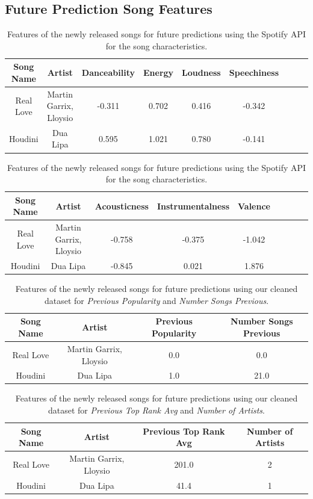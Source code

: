 \documentclass{article}
\begin{document}
\begin{appendices}
\section{Future Prediction Song Features}
\begin{table}[H]
\small
\centering
\caption{Features of the newly released songs for future predictions using the Spotify API for the song characteristics.}\label{table: 4}
\begin{tabular}{|c|c|c|c|c|c|c|c|c|}
\hline
 Song Name & Artist & Danceability & Energy & Loudness & Speechiness \\ 
\hline
 Real Love & Martin Garrix, Lloysio & -0.311 & 0.702 & 0.416 & -0.342 \\
 Houdini & Dua Lipa & 0.595 & 1.021 & 0.780 & -0.141 \\
\hline
\end{tabular}
\end{table}



\begin{table}[H]
\small
\centering
\caption{Features of the newly released songs for future predictions using the Spotify API for the song characteristics.}\label{table: 4}
\begin{tabular}{|c|c|c|c|c|c|c|c|c|}
\hline
 Song Name & Artist & Acousticness & Instrumentalness & Valence  \\ 
\hline
 Real Love & Martin Garrix, Lloysio & -0.758 & -0.375 & -1.042 \\
 Houdini & Dua Lipa & -0.845 & 0.021 & 1.876 \\
\hline
\end{tabular}
\end{table}


\begin{table}[H]
\small
\centering
\caption{Features of the newly released songs for future predictions using our cleaned dataset for \textit{Previous Popularity} and \textit{Number Songs Previous}.}\label{table: 4}
\begin{tabular}{|c|c|c|c|}
\hline
 Song Name & Artist & Previous Popularity & Number Songs Previous \\ 
\hline
 Real Love & Martin Garrix, Lloysio & 0.0 & 0.0  \\
 Houdini & Dua Lipa & 1.0 & 21.0  \\
\hline
\end{tabular}
\end{table}

\begin{table}[H]
\small
\centering
\caption{Features of the newly released songs for future predictions using our cleaned dataset for \textit{Previous Top Rank Avg} and \textit{Number of Artists}.}\label{table: 4}
\begin{tabular}{|c|c|c|c|}
\hline
 Song Name & Artist & Previous Top Rank Avg & Number of Artists  \\ 
\hline
 Real Love & Martin Garrix, Lloysio & 201.0 & 2 \\
 Houdini & Dua Lipa & 41.4 & 1 \\
\hline
\end{tabular}
\end{table}


\end{appendices}
\end{document}
